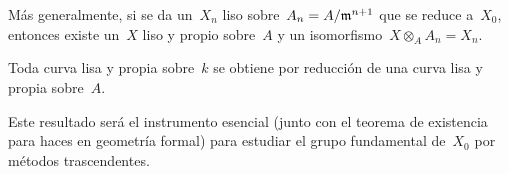 Más generalmente, si se da un~$X_n$ liso sobre~$A_n=A/\mathfrak{m}^{n+1}$ que se reduce a~$X_0$, entonces existe un~$X$ liso y propio sobre~$A$ y un isomorfismo~$X\otimes_AA_n=X_n$.

\begin{corollaire}
\label{III.7.4}
Toda curva lisa y propia sobre~$k$ se obtiene por reducción de una curva lisa y propia sobre~$A$.
\end{corollaire}

Este resultado será el instrumento esencial (junto con el teorema de existencia para haces en geometría formal) para estudiar el grupo fundamental de~$X_0$ por métodos trascendentes.
